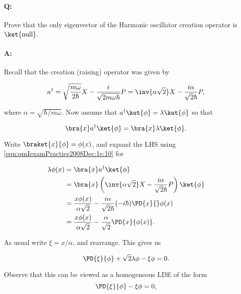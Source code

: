 \paragraph{Q:} Prove that the only eigenvector of the Harmonic oscillator creation operator is $\ket{\text{null}}$.

\paragraph{A:} 

Recall that the creation (raising) operator was given by

\begin{equation}\label{eqn:qmIexamPractice2008Dec:1e:10}
a^\dagger 
= \sqrt{\frac{m \omega}{2 \hbar}} X - \frac{ i }{\sqrt{2 m \omega \hbar} } P
= \inv{ \alpha \sqrt{2} } X - \frac{ i \alpha }{\sqrt{2} \hbar } P,
\end{equation}

where $\alpha = \sqrt{\hbar/m \omega}$.  Now assume that $a^\dagger \ket{\phi} = \lambda \ket{\phi}$ so that 

\begin{equation}\label{eqn:qmIexamPractice2008Dec:1e:20}
\bra{x} a^\dagger \ket{\phi} = \bra{x} \lambda \ket{\phi}.
\end{equation}

Write $\braket{x}{\phi} = \phi(x)$, and expand the LHS using \ref{eqn:qmIexamPractice2008Dec:1e:10} for

\begin{align*}
\lambda \phi(x) 
&= \bra{x} a^\dagger \ket{\phi}  \\
&= \bra{x} \left( \inv{ \alpha \sqrt{2} } X - \frac{ i \alpha }{\sqrt{2} \hbar } P \right) \ket{\phi} \\
&= \frac{x \phi(x)}{ \alpha \sqrt{2} } - \frac{ i \alpha }{\sqrt{2} \hbar } (-i\hbar)\PD{x}{} \phi(x) \\
&= \frac{x \phi(x)}{ \alpha \sqrt{2} } - \frac{ \alpha }{\sqrt{2} } \PD{x}{\phi(x)}.
\end{align*}

As usual write $\xi = x/\alpha$, and rearrange.  This gives us

\begin{equation}\label{eqn:qmIexamPractice2008Dec:1e:30}
\PD{\xi}{\phi} +\sqrt{2} \lambda \phi - \xi \phi = 0.
\end{equation}

Observe that this can be viewed as a homogeneous LDE of the form
\begin{equation}\label{eqn:qmIexamPractice2008Dec:1e:40}
\PD{\xi}{\phi} - \xi \phi = 0,
\end{equation}

